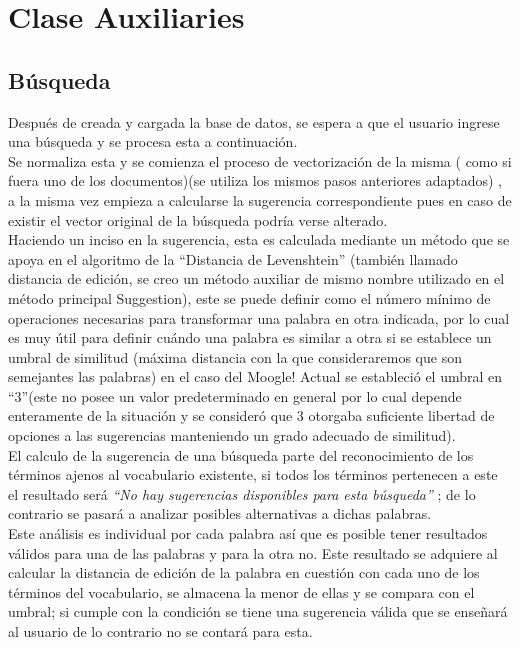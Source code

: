 \documentclass[options]{article}
\begin{document}
\section{Clase Auxiliaries}
\subsection{Búsqueda}
Después de creada y cargada la base de datos, se espera a que el usuario ingrese una búsqueda y se procesa esta a continuación.\\
Se normaliza esta y se comienza el proceso de vectorización de la misma ( como si fuera uno de los documentos)(se utiliza los mismos pasos anteriores adaptados) , a la misma vez empieza a calcularse la sugerencia correspondiente pues en caso de existir el vector original de la búsqueda podría verse alterado.\\
Haciendo un inciso en la sugerencia, esta es calculada mediante un método que se apoya en el algoritmo de la “Distancia de Levenshtein” (también llamado distancia de edición, se creo un método auxiliar de mismo nombre utilizado en el método principal Suggestion), este se puede definir como el número mínimo de operaciones necesarias para transformar una palabra en otra indicada, por lo cual es muy útil para definir cuándo una palabra es similar a otra si se establece un umbral de similitud (máxima distancia con la que consideraremos que son semejantes las palabras) en el caso del Moogle! Actual se estableció el umbral en “3”(este no posee un valor predeterminado en general por lo cual depende enteramente de la situación y se consideró que 3 otorgaba suficiente libertad de opciones a las sugerencias manteniendo un grado adecuado de similitud).\\
El calculo de la sugerencia de una búsqueda parte del reconocimiento de los términos ajenos al vocabulario existente, si todos los términos pertenecen a este el resultado será 
\textit{“No hay sugerencias disponibles para esta búsqueda”}
; de lo contrario se pasará a analizar posibles alternativas a dichas palabras.\\
Este análisis es individual por cada palabra así que es posible tener resultados válidos para una de las palabras y para la otra no. Este resultado se adquiere al calcular la distancia de edición de la palabra en cuestión con cada uno de los términos del vocabulario, se almacena la menor de ellas y se compara con el umbral; si cumple con la condición se tiene una sugerencia válida que se enseñará al usuario de lo contrario no se contará para esta.\\
\end{document}
